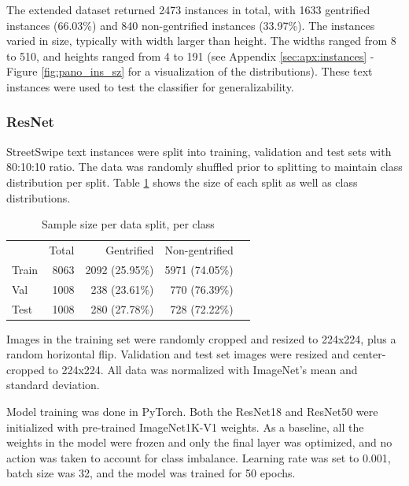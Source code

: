 The extended dataset returned 2473 instances in total, with 1633 gentrified instances (66.03\%) and 840 non-gentrified instances (33.97\%). The instances varied in size, typically with width larger than height. The widths ranged from 8 to 510, and heights ranged from 4 to 191 (see Appendix \ref{sec:apx:instances} - Figure \ref{fig:pano_ins_sz} for a visualization of the distributions). These text instances were used to test the classifier for generalizability.


\subsubsection{ResNet}

StreetSwipe text instances were split into training, validation and test sets with 80:10:10 ratio. The data was randomly shuffled prior to splitting to maintain class distribution per split. Table \ref{tab:data_split} shows the size of each split as well as class distributions.

\begin{table}[h!]
    \begin{tabular}{lrrrl}
    \toprule
            & \multicolumn{1}{r}{Total} &\multicolumn{1}{r}{Gentrified} & \multicolumn{1}{r}{Non-gentrified} \\ \cline{1-4}
Train       & 8063                      & 2092 (25.95\%)                & 5971 (74.05\%)      \\
Val         & 1008                      & 238 (23.61\%)                 & 770 (76.39\%)       \\
Test        & 1008                      & 280 (27.78\%)                 & 728 (72.22\%)       \\
    \bottomrule
    \end{tabular}
    \vspace{\baselineskip}
    \caption{Sample size per data split, per class}
    \label{tab:data_split}
    \vspace{-5mm}
\end{table}

Images in the training set were randomly cropped and resized to 224x224, plus a random horizontal flip. Validation and test set images were resized and center-cropped to 224x224. All data was normalized with ImageNet's mean and standard deviation.

Model training was done in PyTorch. Both the ResNet18 and ResNet50 were initialized with pre-trained ImageNet1K-V1 weights. As a baseline, all the weights in the model were frozen and only the final layer was optimized, and no action was taken to account for class imbalance. Learning rate was set to 0.001, batch size was 32, and the model was trained for 50 epochs.

